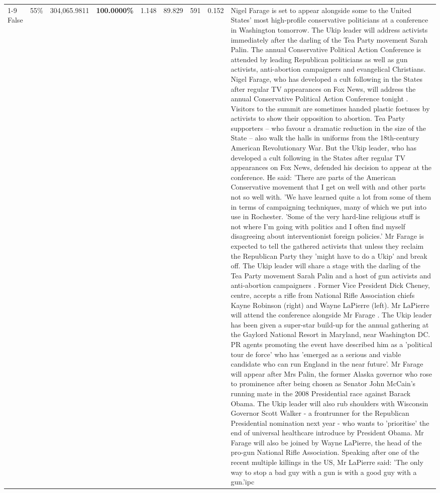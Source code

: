 \begin{table}[H]
\begin{tabular}{lllrlllll}
\cline{1-9} \cline{2-9}
False & 55\% & \color{red} 304,065.9811 & \bfseries \color{red} 100.0000\% & 1.148 & 89.829 & 591 & 0.152 & Nigel Farage is set to appear alongside some to the United States' most high-profile conservative politicians at a conference in Washington tomorrow. The Ukip leader will address activists immediately after the darling of the Tea Party movement Sarah Palin. The annual Conservative Political Action Conference is attended by leading Republican politicians as well as gun activists, anti-abortion campaigners and evangelical Christians. Nigel Farage, who has developed a cult following in the States after regular TV appearances on Fox News, will address the annual Conservative Political Action Conference tonight . Visitors to the summit are sometimes handed plastic foetuses by activists to show their opposition to abortion. Tea Party supporters – who favour a dramatic reduction in the size of the State – also walk the halls in uniforms from the 18th-century American Revolutionary War. But the Ukip leader, who has developed a cult following in the States after regular TV appearances on Fox News, defended his decision to appear at the conference. He said: 'There are parts of the American Conservative movement that I get on well with and other parts not so well with. 'We have learned quite a lot from some of them in terms of campaigning techniques, many of which we put into use in Rochester. 'Some of the very hard-line religious stuff is not where I'm going with politics and I often find myself disagreeing about interventionist foreign policies.' Mr Farage is expected to tell the gathered activists that unless they reclaim the Republican Party they 'might have to do a Ukip' and break off. The Ukip leader will share a stage with the darling of the Tea Party movement Sarah Palin and a host of gun activists and anti-abortion campaigners . Former Vice President Dick Cheney, centre, accepts a rifle from National Rifle Association chiefs Kayne Robinson (right) and Wayne LaPierre (left). Mr LaPierre will attend the conference alongside Mr Farage . The Ukip leader has been given a super-star build-up for the annual gathering at the Gaylord National Resort in Maryland, near Washington DC. PR agents promoting the event have described him as a 'political tour de force' who has 'emerged as a serious and viable candidate who can run England in the near future'. Mr Farage will appear after Mrs Palin, the former Alaska governor who rose to prominence after being chosen as Senator John McCain's running mate in the 2008 Presidential race against Barack Obama. The Ukip leader will also rub shoulders with Wisconsin Governor Scott Walker - a frontrunner for the Republican Presidential nomination next year - who wants to 'prioritise' the end of universal healthcare introduce by President Obama. Mr Farage will also be joined by Wayne LaPierre, the head of the pro-gun National Rifle Association. Speaking after one of the recent multiple killings in the US, Mr LaPierre said: 'The only way to stop a bad guy with a gun is with a good guy with a gun.'ipc \\

\end{tabular}
\end{table}
